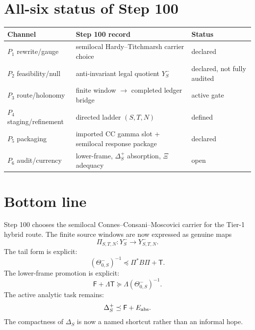 \documentclass[11pt]{article}
\newcommand{\Y}{Y}
\newcommand{\F}{\mathsf F}
\newcommand{\Ttail}{\mathsf T}
\begin{document}
\section{All-six status of Step 100}
\begin{center}
\begin{tabular}{lll}
\toprule
Channel & Step 100 record & Status\\
\midrule
$P_1$ rewrite/gauge & semilocal Hardy--Titchmarsh carrier choice & declared\\
$P_2$ feasibility/null & anti-invariant legal quotient $Y_S^-$ & declared, not fully audited\\
$P_3$ route/holonomy & finite window $\to$ completed ledger bridge & active gate\\
$P_4$ staging/refinement & directed ladder $(S,T,N)$ & defined\\
$P_5$ packaging & imported CC gamma slot + semilocal response package & declared\\
$P_6$ audit/currency & lower-frame, $\Delta_S^+$ absorption, $\Xi$ adequacy & open\\
\bottomrule
\end{tabular}
\end{center}

\section{Bottom line}
Step 100 chooses the semilocal Connes--Consani--Moscovici carrier for the Tier-1 hybrid route.  The finite source windows are now expressed as genuine maps
\[
  \Pi_{S,T,N}:\Y_S^-\to\Y_{S,T,N}^-.
\]
The tail form is explicit:
\[
  (\Theta_{0,S}^-)^{-1}\preceq \Pi^*B\Pi+\Ttail.
\]
The lower-frame promotion is explicit:
\[
  \F+\Lambda\Ttail\succeq \Lambda(\Theta_{0,S}^-)^{-1}.
\]
The active analytic task remains:
\[
  \Delta_S^+\preceq \F+E_{\rm abs}.
\]
The compactness of $\Delta_S$ is now a named shortcut rather than an informal hope.
\end{document}
